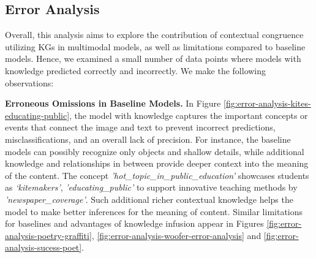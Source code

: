 \subsection{Error Analysis}
Overall, this analysis aims to explore the contribution of contextual congruence utilizing KGs in multimodal models, as well as limitations compared to baseline models. Hence, we examined a small number of data points where models with knowledge predicted correctly and incorrectly. We make the following observations:

\noindent \textbf{Erroneous Omissions in Baseline Models.}  In Figure \ref{fig:error-analysis-kites-educating-public}, %
the model with knowledge captures the important concepts or events that connect the image and text to prevent incorrect predictions, misclassifications, and an overall lack of precision. For instance, the baseline models can possibly recognize only objects and shallow details, while additional knowledge and relationships in between provide deeper context into the meaning of the content. The concept \textit{'hot\_topic\_in\_public\_education'} showcases students as \textit{‘kitemakers’}, \textit{'educating\_public'}  to support innovative teaching methods by \textit{'newspaper\_coverage'}. Such additional richer contextual knowledge helps the model to make better inferences for the meaning of content. 
Similar limitations for baselines and advantages of knowledge infusion appear in  Figures \ref{fig:error-analysis-poetry-graffiti}, \ref{fig:error-analysis-woofer-error-analysis} and \ref{fig:error-analysis-sucess-poet}. 

